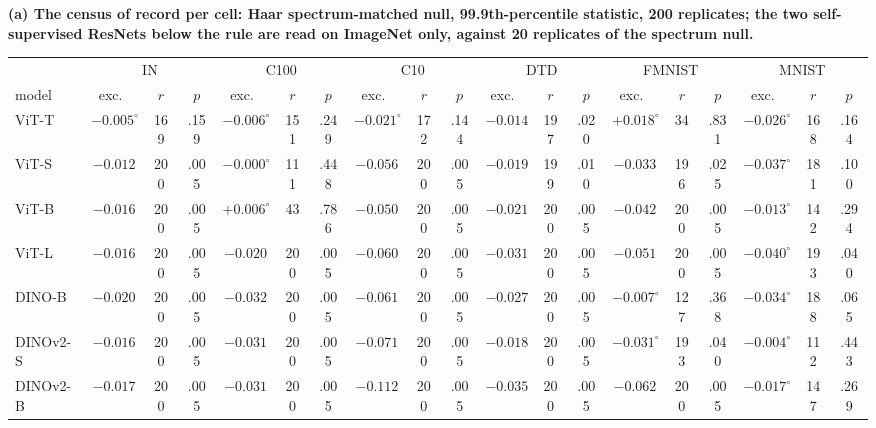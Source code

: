 \begin{table}[H]
\centering
\scriptsize
\setlength{\tabcolsep}{1.4pt}
\noindent\textbf{(a) The census of record per cell: Haar spectrum-matched null, 99.9th-percentile statistic, 200 replicates; the two self-supervised ResNets below the rule are read on ImageNet only, against 20 replicates of the spectrum null.}\par\vspace{1.5pt}
\begin{tabular}{lcccccccccccccccccc}
\toprule
 & \multicolumn{3}{c}{IN} & \multicolumn{3}{c}{C100} & \multicolumn{3}{c}{C10} & \multicolumn{3}{c}{DTD} & \multicolumn{3}{c}{FMNIST} & \multicolumn{3}{c}{MNIST} \\
model & exc.\ & $r$ & $p$ & exc.\ & $r$ & $p$ & exc.\ & $r$ & $p$ & exc.\ & $r$ & $p$ & exc.\ & $r$ & $p$ & exc.\ & $r$ & $p$ \\
\midrule
ViT-T & $-0.005^{\circ}$ & 169 & .159 & $-0.006^{\circ}$ & 151 & .249 & $-0.021^{\circ}$ & 172 & .144 & $-0.014$ & 197 & .020 & $+0.018^{\circ}$ & 34 & .831 & $-0.026^{\circ}$ & 168 & .164 \\
ViT-S & $-0.012$ & 200 & .005 & $-0.000^{\circ}$ & 111 & .448 & $-0.056$ & 200 & .005 & $-0.019$ & 199 & .010 & $-0.033$ & 196 & .025 & $-0.037^{\circ}$ & 181 & .100 \\
ViT-B & $-0.016$ & 200 & .005 & $+0.006^{\circ}$ & 43 & .786 & $-0.050$ & 200 & .005 & $-0.021$ & 200 & .005 & $-0.042$ & 200 & .005 & $-0.013^{\circ}$ & 142 & .294 \\
ViT-L & $-0.016$ & 200 & .005 & $-0.020$ & 200 & .005 & $-0.060$ & 200 & .005 & $-0.031$ & 200 & .005 & $-0.051$ & 200 & .005 & $-0.040^{\circ}$ & 193 & .040 \\
\midrule
DINO-B & $-0.020$ & 200 & .005 & $-0.032$ & 200 & .005 & $-0.061$ & 200 & .005 & $-0.027$ & 200 & .005 & $-0.007^{\circ}$ & 127 & .368 & $-0.034^{\circ}$ & 188 & .065 \\
DINOv2-S & $-0.016$ & 200 & .005 & $-0.031$ & 200 & .005 & $-0.071$ & 200 & .005 & $-0.018$ & 200 & .005 & $-0.031^{\circ}$ & 193 & .040 & $-0.004^{\circ}$ & 112 & .443 \\
DINOv2-B & $-0.017$ & 200 & .005 & $-0.031$ & 200 & .005 & $-0.112$ & 200 & .005 & $-0.035$ & 200 & .005 & $-0.062$ & 200 & .005 & $-0.017^{\circ}$ & 147 & .269 \\

\end{tabular}
\end{table}
